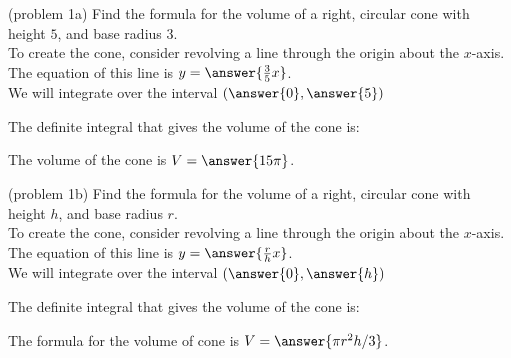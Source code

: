 \documentclass{ximera}
\begin{document}
\begin{problem}(problem 1a)
Find the formula for the volume of a right, circular cone with height $5$, and base radius $3$.\\

To create the cone, consider revolving a line through the origin about the $x$-axis.\\
The equation of this line is $y = \answer{\frac{3}{5} x}$.\\
We will integrate over the interval $\left(\answer{0},\answer{5}\right)$

The definite integral that gives the volume of the cone is:\\
\begin{multipleChoice}
\end{multipleChoice}

The volume of the cone is $V = \answer{15 \pi }$.










\end{problem}



\begin{problem}(problem 1b)
Find the formula for the volume of a right, circular cone with height $h$, and base radius $r$.\\

To create the cone, consider revolving a line through the origin about the $x$-axis.\\
The equation of this line is $y = \answer{\frac{r}{h} x}$.\\
We will integrate over the interval $\left(\answer{0},\answer{h}\right)$

The definite integral that gives the volume of the cone is:\\
\begin{multipleChoice}
\end{multipleChoice}

The formula for the volume of cone is $V = \answer{\pi r^2 h/3}$.

\end{problem}
\end{document}

